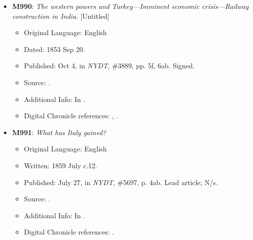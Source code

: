 \begin{itemize}
    \item \textbf{M990}: \textit{The western powers and Turkey---Imminent economic crisis---Railway construction in India}. [Untitled]
    \begin{itemize}
        \item Original Language: English
        \item Dated: 1853 Sep 20.
        \item Published: Oct 4, in \textit{NYDT}, \#3889, pp. 5f, 6ab. Signed.
        \item Source: .
        \item Additional Info: In .
        \item Digital Chronicle references: , .
    \end{itemize}

    \item \textbf{M991}: \textit{What has Italy gained?}
    \begin{itemize}
        \item Original Language: English
        \item Written: 1859 July c.12.
        \item Published: July 27, in \textit{NYDT}, \#5697, p. 4ab. Lead article; N/s.
        \item Source: .
        \item Additional Info: In .
        \item Digital Chronicle references: .
    \end{itemize}


\end{itemize}
